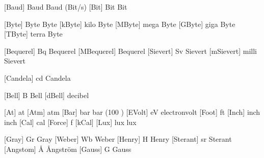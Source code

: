 \setuplabeltext
  [\s!en]
  [u:vac=alternating current,
   u:vdc=different current]

\setuplabeltext
  [\s!de]
  [u:vac=Wechselspannung,
   u:vdc=Gleichspannung]


 [Baud]  {Baud}         {Baud (Bit/s)}
 [Bit]   {Bit}          {Bit}

 [Byte]  {Byte}         {Byte}
 [kByte] {\Kilo  \Byte} {kilo Byte}
 [MByte] {\Mega  \Byte} {mega Byte}
 [GByte] {\Giga  \Byte} {giga Byte}
 [TByte] {\Terra \Byte} {terra Byte}


 [Bequerel]  {Bq}              {Bequerel}
 [MBequerel] {\Mega \Bequerel} {Bequerel}
 [Sievert]   {Sv}              {Sievert}
 [mSievert]  {\Milli \Sievert} {milli Sievert}


 [Candela] {cd} {Candela}


 [Bell]  {B}           {Bell}
 [dBell] {\Deci \Bell} {decibel}


 [At]    {at}         {}
 [Atm]   {atm}        {}
 [Bar]   {bar}        {bar (100 \Kilo \Pascal)}
 [EVolt] {eV}         {electronvolt}
 [Foot]  {ft}         {}
 [Inch]  {inch}       {inch}
 [Cal]   {cal}        {}
 [Force] {f}          {}
 [kCal]  {\Kilo \Cal} {}
 [Lux]   {lux}        {lux}


 [Gray]    {Gr}  {Gray}  
 [Weber]   {Wb}  {Weber} 
 [Henry]   {H}   {Henry} 
 [Sterant] {sr}  {Sterant}
 [Angstom] {\AA} {\AA ngstr\"om}
 [Gauss]   {G}   {Gauss}

